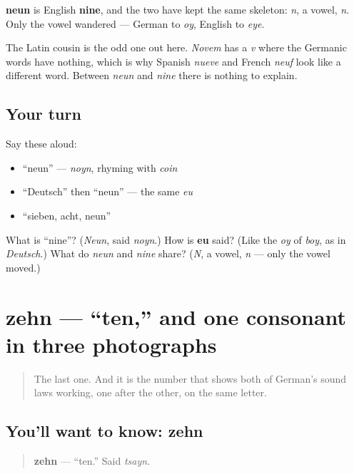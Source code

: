 \begin{cousinweb}
\textbf{neun} is English \textbf{nine}, and the two have kept the same skeleton: \emph{n}, a vowel, \emph{n}. Only the vowel wandered — German to \emph{oy}, English to \emph{eye}.

The Latin cousin is the odd one out here. \emph{Novem} has a \emph{v} where the Germanic words have nothing, which is why Spanish \emph{nueve} and French \emph{neuf} look like a different word. Between \emph{neun} and \emph{nine} there is nothing to explain.
\end{cousinweb}

\subsection*{Your turn}
Say these aloud:

\begin{itemize}
\raggedright
  \item \textquotedblleft{}neun\textquotedblright{} — \emph{noyn}, rhyming with \emph{coin}
  \item \textquotedblleft{}Deutsch\textquotedblright{} then \textquotedblleft{}neun\textquotedblright{} — the same \emph{eu}
  \item \textquotedblleft{}sieben, acht, neun\textquotedblright{}
\end{itemize}

\begin{tcolorbox}[breakable,colback=teal!4,colframe=teal!35!black,title={Before you move on}]
What is \textquotedblleft{}nine\textquotedblright{}? (\emph{Neun}, said \emph{noyn}.) How is \textbf{eu} said? (Like the \emph{oy} of \emph{boy}, as in \emph{Deutsch}.) What do \emph{neun} and \emph{nine} share? (\emph{N}, a vowel, \emph{n} — only the vowel moved.)
\end{tcolorbox}
\section[zehn]{zehn — \textquotedblleft{}ten,\textquotedblright{} and one consonant in three photographs}

\label{lesson:GE-C06-zehn}



\begin{quote}
The last one. And it is the number that shows both of German's sound laws working, one after the other, on the same letter.
\end{quote}

\subsection*{You'll want to know: zehn}
\begin{quote}
\textbf{zehn} — \textquotedblleft{}ten.\textquotedblright{} Said \emph{tsayn}.
\end{quote}

